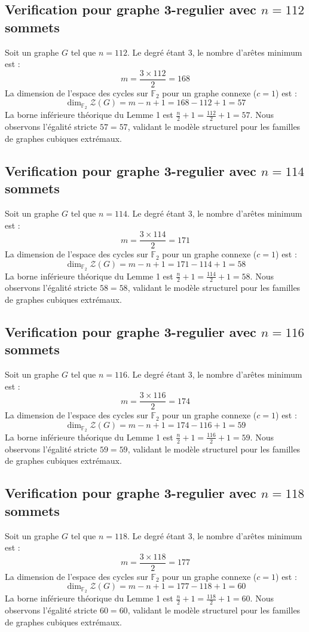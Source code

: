 \documentclass[11pt,a4paper]{article}
\begin{document}
\subsection{Verification pour graphe 3-regulier avec $n=112$ sommets}
Soit un graphe $G$ tel que $n = 112$. Le degré étant 3, le nombre d'arêtes minimum est :
$$ m = \frac{3 \times 112}{2} = 168 $$
La dimension de l'espace des cycles sur $\mathbb{F}_2$ pour un graphe connexe ($c=1$) est :
$$ \dim_{\mathbb{F}_2} \mathcal{Z}(G) = m - n + 1 = 168 - 112 + 1 = 57 $$
La borne inférieure théorique du Lemme 1 est $\frac{n}{2} + 1 = \frac{112}{2} + 1 = 57$.
Nous observons l'égalité stricte $57 = 57$, validant le modèle structurel pour les familles de graphes cubiques extrémaux.

\subsection{Verification pour graphe 3-regulier avec $n=114$ sommets}
Soit un graphe $G$ tel que $n = 114$. Le degré étant 3, le nombre d'arêtes minimum est :
$$ m = \frac{3 \times 114}{2} = 171 $$
La dimension de l'espace des cycles sur $\mathbb{F}_2$ pour un graphe connexe ($c=1$) est :
$$ \dim_{\mathbb{F}_2} \mathcal{Z}(G) = m - n + 1 = 171 - 114 + 1 = 58 $$
La borne inférieure théorique du Lemme 1 est $\frac{n}{2} + 1 = \frac{114}{2} + 1 = 58$.
Nous observons l'égalité stricte $58 = 58$, validant le modèle structurel pour les familles de graphes cubiques extrémaux.

\subsection{Verification pour graphe 3-regulier avec $n=116$ sommets}
Soit un graphe $G$ tel que $n = 116$. Le degré étant 3, le nombre d'arêtes minimum est :
$$ m = \frac{3 \times 116}{2} = 174 $$
La dimension de l'espace des cycles sur $\mathbb{F}_2$ pour un graphe connexe ($c=1$) est :
$$ \dim_{\mathbb{F}_2} \mathcal{Z}(G) = m - n + 1 = 174 - 116 + 1 = 59 $$
La borne inférieure théorique du Lemme 1 est $\frac{n}{2} + 1 = \frac{116}{2} + 1 = 59$.
Nous observons l'égalité stricte $59 = 59$, validant le modèle structurel pour les familles de graphes cubiques extrémaux.

\subsection{Verification pour graphe 3-regulier avec $n=118$ sommets}
Soit un graphe $G$ tel que $n = 118$. Le degré étant 3, le nombre d'arêtes minimum est :
$$ m = \frac{3 \times 118}{2} = 177 $$
La dimension de l'espace des cycles sur $\mathbb{F}_2$ pour un graphe connexe ($c=1$) est :
$$ \dim_{\mathbb{F}_2} \mathcal{Z}(G) = m - n + 1 = 177 - 118 + 1 = 60 $$
La borne inférieure théorique du Lemme 1 est $\frac{n}{2} + 1 = \frac{118}{2} + 1 = 60$.
Nous observons l'égalité stricte $60 = 60$, validant le modèle structurel pour les familles de graphes cubiques extrémaux.
\end{document}
